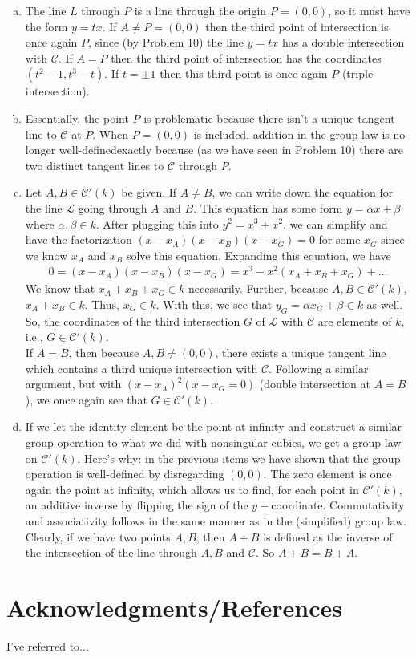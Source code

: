 \documentclass[12pt]{article}
\newcommand{\al}{\alpha}
\newcommand{\be}{\beta}
\begin{document}
\begin{enumerate}[(a)]
	\item The line $L$ through $P$ is a line through the origin $P=(0,0)$, so it must have the form $y = tx$. If $A \neq P = (0,0)$ then the third point of intersection is once again $P$, since (by Problem 10) the line $y = tx$ has a double intersection with $\mathcal{C}$. If $A = P$ then the third point of intersection has the coordinates $(t^2-1, t^3-t)$. If $t = \pm 1$ then this third point is once again $P$ (triple intersection). 
	\item Essentially, the point $P$ is problematic because there isn't a unique tangent line to $\mathcal{C}$ at $P$. When $P = (0,0)$ is included, addition in the group law is no longer well-defined\textemdash exactly because (as we have seen in Problem 10) there are two distinct tangent lines to $\mathcal{C}$ through $P$.  
	\item  Let $A,B\in \mathcal{C}'(k)$ be given. If $A\neq B$, we can write down the equation for the line $\mathcal{L}$ going through $A$ and $B$. This equation has some form $y = \al x + \be$ where $\al,\be \in k$. After plugging this into $y^2 = x^3 + x^2$, we can simplify and have the factorization $(x-x_A)(x-x_B)(x-x_G) = 0$ for some $x_G$ since we know $x_A$ and $x_B$ solve this equation. Expanding this equation, we have
	\begin{align}
	0 = (x-x_A)(x-x_B)(x-x_G) = x^3 - x^2(x_A+x_B+x_G) + \dots
	\end{align}
	We know that $x_A+x_B+x_G \in k$ necessarily. Further, because $A,B \in \mathcal{C}'(k)$, $x_A + x_B \in k$. Thus, $x_G \in k$. With this, we see that $y_G = \al x_G + \be \in k$ as well. So, the coordinates of the third intersection $G$ of $\mathcal{L}$ with $\mathcal{C}$ are elements of $k$, i.e., $G \in \mathcal{C}'(k)$.  \\
	
	If $A = B$, then because $A,B \neq (0,0)$, there exists a unique tangent line which contains a third unique intersection with $\mathcal{C}$. Following a similar argument, but with $(x-x_A)^2(x-x_G = 0)$ (double intersection at $A=B$), we once again see that $G \in \mathcal{C}'(k)$. 
	
	
	\item If we let the identity element be the point at infinity and construct a similar group operation to what we did with nonsingular cubics, we get a group law on $\mathcal{C}'(k)$. Here's why: in the previous items we have shown that the group operation is well-defined by disregarding $(0,0)$. The zero element is once again the point at infinity, which allows us to find, for each point in $\mathcal{C}'(k)$, an additive inverse by flipping the sign of the $y-$coordinate. Commutativity and associativity follows in the same manner as in the (simplified) group law. Clearly, if we have two points $A,B$, then $A+B$ is defined as the inverse of the intersection of the line through $A,B$ and $\mathcal{C}$. So $A+B = B+A$. 
\end{enumerate}


\newpage



\section*{Acknowledgments/References}

I've referred to...




	
\end{document}
